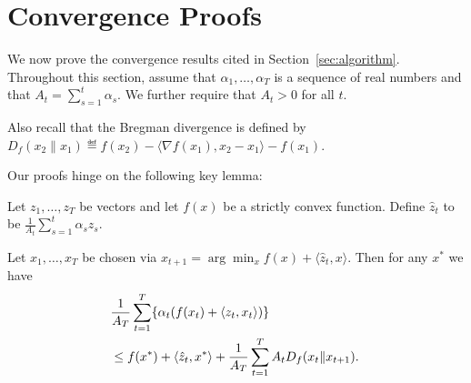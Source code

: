 \documentclass[paper.tex]{subfiles}
\begin{document}
\section{Convergence Proofs}
\label{sec:proofs}
We now prove the convergence results cited in Section~\ref{sec:algorithm}. 
Throughout this section, assume that $\alpha_1,\ldots,\alpha_T$ is 
a sequence of real numbers and that $A_t = \sum_{s=1}^t \alpha_s$. 
We further require that $A_t > 0$ for all $t$.

Also recall that the Bregman divergence is defined by 
$D_f(x_2 \| x_1) \eqdef f(x_2) - \langle \nabla f(x_1), x_2-x_1 \rangle - f(x_1)$.

Our proofs hinge on the following key lemma:
\begin{lemma}
\label{lem:bregman}
Let $z_1,\ldots,z_T$ be vectors and let $f(x)$ be a strictly convex 
function. Define $\hat{z}_t$ to be $\frac{1}{A_t} \sum_{s=1}^t \alpha_s z_s$.

Let $x_1,\ldots,x_T$ be chosen via $x_{t+1} = \arg\min_{x} f(x) + \langle \hat{z}_t, x\rangle$. 
Then for any $x^*$ we have
\begin{align*}
\lefteqn{\frac{1}{A_T} \sum_{t=1}^T \{\alpha_t(f(x_t) + \langle z_t, x_t \rangle)\}} \\
\phantom{+} &\leq f(x^*) + \langle \hat{z}_t, x^* \rangle + \frac{1}{A_T} \sum_{t=1}^T A_t D_{f}(x_t \| x_{t+1}). 
\end{align*}
\end{lemma}
\end{document}
